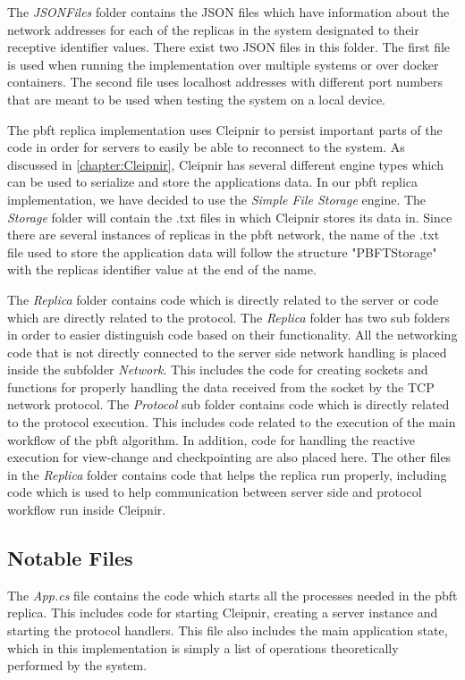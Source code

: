 The \emph{JSONFiles} folder contains the JSON files which have information about the network addresses for each of the replicas in the system designated to their receptive identifier values. There exist two JSON files in this folder. The first file is used when running the implementation over multiple systems or over docker containers. The second file uses localhost addresses with different port numbers that are meant to be used when testing the system on a local device.

The \ac{pbft} replica implementation uses Cleipnir to persist important parts of the code in order for servers to easily be able to reconnect to the system. As discussed in \autoref{chapter:Cleipnir}, Cleipnir has several different engine types which can be used to serialize and store the applications data. In our \ac{pbft} replica implementation, we have decided to use the \emph{Simple File Storage} engine. The \emph{Storage} folder will contain the .txt files in which Cleipnir stores its data in. Since there are several instances of replicas in the \ac{pbft} network, the name of the .txt file used to store the application data will follow the structure "PBFTStorage" with the replicas identifier value at the end of the name.

The \emph{Replica} folder contains code which is directly related to the server or code which are directly related to the protocol. The \emph{Replica} folder has two sub folders in order to easier distinguish code based on their functionality. All the networking code that is not directly connected to the server side network handling is placed inside the subfolder \emph{Network}. This includes the code for creating sockets and functions for properly handling the data received from the socket by the TCP network protocol.
The \emph{Protocol} sub folder contains code which is directly related to the protocol execution. This includes code related to the execution of the main workflow of the \ac{pbft} algorithm. In addition, code for handling the reactive execution for view-change and checkpointing are also placed here.
The other files in the \emph{Replica} folder contains code that helps the replica run properly, including code which is used to help communication between server side and protocol workflow run inside Cleipnir.

\subsection{Notable Files}
The \emph{App.cs} file contains the code which starts all the processes needed in the \ac{pbft} replica. This includes code for starting Cleipnir, creating a server instance and starting the protocol handlers. This file also includes the main application state, which in this implementation is simply a list of operations theoretically performed by the system.

